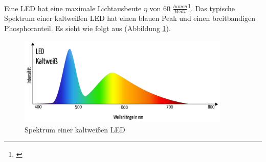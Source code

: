 \noindent Eine LED hat eine maximale Lichtausbeute $\eta$ von 60 $\frac{lumen}{Watt}$\footnote{\cite[35]{greule}}. Das typische Spektrum einer kaltweißen LED hat einen blauen Peak und einen breitbandigen Phosphoranteil. Es sieht wie folgt aus (Abbildung \ref{b_ledspek}).

\begin{figure}[htp]     %
\centering
\includegraphics[width=0.9\textwidth]{bilder/ledspek} 
\caption {Spektrum einer kaltweißen LED\protect\footnotemark}\label{b_ledspek}
\end{figure}













